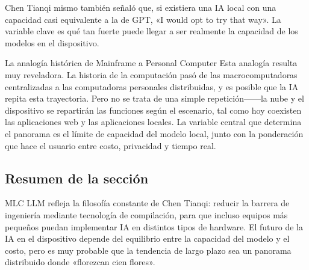 Chen Tianqi mismo también señaló que, si existiera una IA local con una capacidad casi equivalente a la de GPT, «I would opt to try that way». La variable clave es qué tan fuerte puede llegar a ser realmente la capacidad de los modelos en el dispositivo.

\begin{knowledgebox}{La analogía histórica de Mainframe a Personal Computer}
Esta analogía resulta muy reveladora. La historia de la computación pasó de las macrocomputadoras centralizadas a las computadoras personales distribuidas, y es posible que la IA repita esta trayectoria. Pero no se trata de una simple repetición------la nube y el dispositivo se repartirán las funciones según el escenario, tal como hoy coexisten las aplicaciones web y las aplicaciones locales. La variable central que determina el panorama es el límite de capacidad del modelo local, junto con la ponderación que hace el usuario entre costo, privacidad y tiempo real.
\end{knowledgebox}

\subsection{Resumen de la sección}

MLC LLM refleja la filosofía constante de Chen Tianqi: reducir la barrera de ingeniería mediante tecnología de compilación, para que incluso equipos más pequeños puedan implementar IA en distintos tipos de hardware. El futuro de la IA en el dispositivo depende del equilibrio entre la capacidad del modelo y el costo, pero es muy probable que la tendencia de largo plazo sea un panorama distribuido donde «florezcan cien flores».
